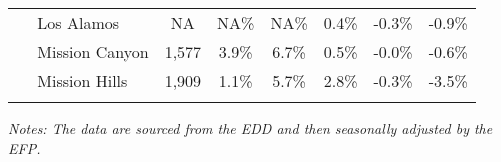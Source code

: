 \documentclass[12pt]{article}
\begin{document}
\begin{landscape}
\begin{table}
\begin{tabular}{|l|c|c|c||c|c|c|}
$\quad$ Los Alamos & NA & NA\% & NA\% & 0.4\% & -0.3\% & -0.9\% \\
$\quad$ Mission Canyon & 1,577 & 3.9\% & 6.7\% & 0.5\% & -0.0\% & -0.6\% \\
$\quad$ Mission Hills & 1,909 & 1.1\% & 5.7\% & 2.8\% & -0.3\% & -3.5\% \\
&&&&&& \\ \hline \hline
\end{tabular}
\par
\vspace{.5em}
\footnotesize
\textit{Notes: The data are sourced from the EDD and then seasonally adjusted by the EFP.}
\end{table}
\end{landscape}
\end{document}
